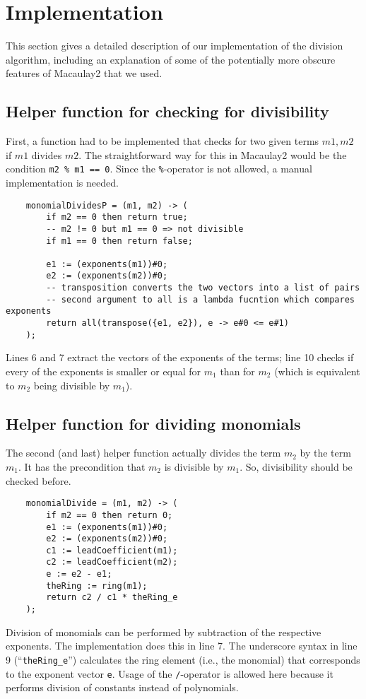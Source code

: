 \documentclass[a4paper]{scrartcl}
\begin{document}
\section{Implementation}
This section gives a detailed description of our implementation of the division algorithm, including an explanation of some of the potentially more obscure features of Macaulay2 that we used. 
\subsection{Helper function for checking for divisibility}
First, a function had to be implemented that checks for two given terms $m1, m2$ if $m1$ divides $m2$.
The straightforward way for this in Macaulay2 would be the condition \texttt{m2 \% m1 == 0}.
Since the \texttt{\%}-operator is not allowed, a manual implementation is needed.
\begin{lstlisting}
	monomialDividesP = (m1, m2) -> (
		if m2 == 0 then return true;
		-- m2 != 0 but m1 == 0 => not divisible
		if m1 == 0 then return false;
		
		e1 := (exponents(m1))#0;
		e2 := (exponents(m2))#0;
		-- transposition converts the two vectors into a list of pairs
		-- second argument to all is a lambda fucntion which compares exponents
		return all(transpose({e1, e2}), e -> e#0 <= e#1)
	);
\end{lstlisting}
Lines 6 and 7 extract the vectors of the exponents of the terms; line 10 checks if every of the exponents is smaller or equal for $m_1$ than for $m_2$ (which is equivalent to $m_2$ being divisible by $m_1$).
\subsection{Helper function for dividing monomials}
The second (and last) helper function actually divides the term $m_2$ by the term $m_1$.
It has the precondition that $m_2$ is divisible by $m_1$.
So, divisibility should be checked before.
\begin{lstlisting}
	monomialDivide = (m1, m2) -> (
		if m2 == 0 then return 0;
		e1 := (exponents(m1))#0;
		e2 := (exponents(m2))#0;
		c1 := leadCoefficient(m1);
		c2 := leadCoefficient(m2);
		e := e2 - e1;
		theRing := ring(m1);
		return c2 / c1 * theRing_e
	);
\end{lstlisting}
Division of monomials can be performed by subtraction of the respective exponents.
The implementation does this in line 7.
The underscore syntax in line 9 (“\texttt{theRing\_e}”) calculates the ring element (i.e., the monomial) that corresponds to the exponent vector \texttt{e}.
Usage of the \texttt{/}-operator is allowed here because it performs division of constants instead of polynomials.
\end{document}
